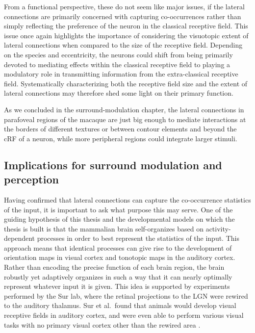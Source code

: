 From a functional perspective, these do not seem like major issues,
if the lateral connections are primarily concerned
with capturing co-occurrences rather than simply reflecting the
preference of the neuron in the classical receptive field. This issue once
again highlights the importance of considering the visuotopic extent of
lateral connections when compared to the size of the receptive
field. Depending on the species and eccentricity, the neurons could
shift from being primarily devoted to mediating effects within the
classical receptive field to playing a modulatory role in transmitting
information from the extra-classical receptive field. Systematically
characterizing both the receptive field size and the extent of lateral
connections may therefore shed some light on their primary function.

As we concluded in the surround-modulation chapter, the lateral
connections in parafoveal regions of the macaque are just big enough
to mediate interactions at the borders of different textures or
between contour elements and beyond the cRF of a neuron, while more
peripheral regions could integrate larger stimuli.

\subsection{Implications for surround modulation and perception}

Having confirmed that lateral connections can capture the
co-occurrence statistics of the input, it is important to ask what
purpose this may serve. One of the guiding hypothesis of this thesis
and the developmental models on which the thesis is built is that the
mammalian brain self-organizes based on activity-dependent processes
in order to best represent the statistics of the input. This approach
means that identical processes can give rise to the development of
orientation maps in visual cortex and tonotopic maps in the auditory
cortex. Rather than encoding the precise function of each brain
region, the brain robustly yet adaptively organizes in such a way that
it can nearly optimally represent whatever input it is given. This
idea is supported by experiments performed by the Sur lab, where the
retinal projections to the LGN were rewired to the auditory thalamus.
Sur et al.\ found that animals would develop visual receptive fields
in auditory cortex, and were even able to perform various visual tasks
with no primary visual cortex other than the rewired area
\citep{vonMelchner2000}.

